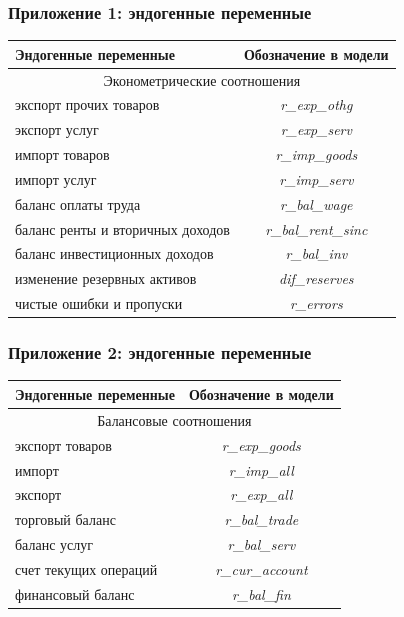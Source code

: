 \documentclass[9pt]{beamer}
\begin{document}
\begin{frame}
\frametitle{Приложение 1: эндогенные переменные}
\small
\begin{center}
	\begin{tabular}{ l | c }
		\toprule
		Эндогенные переменные  & Обозначение в модели  \\
		\midrule
		\multicolumn{2}{c}{Эконометрические соотношения}\\
		\midrule 
		экспорт прочих товаров & \textit{ r\_exp\_othg } \\
		экспорт услуг & \textit{ r\_exp\_serv } \\
		импорт товаров &  \textit{ r\_imp\_goods } \\  
		импорт услуг &  \textit{ r\_imp\_serv } \\  
		баланс оплаты труда &  \textit{ r\_bal\_wage } \\  
		баланс ренты и вторичных доходов &  \textit{ r\_bal\_rent\_sinc } \\ 
		баланс инвестиционных доходов &  \textit{ r\_bal\_inv } \\
		изменение резервных активов &  \textit{ dif\_reserves } \\
		чистые ошибки и пропуски &  \textit{ r\_errors } \\
		\bottomrule
		\end{tabular}

	\label{tab:2}
\end{center}

\end{frame}

\begin{frame}
	\frametitle{Приложение 2: эндогенные переменные}
	\small
	\begin{center}
		\begin{tabular}{ l | c }
			\toprule
			Эндогенные переменные  & Обозначение в модели  \\
			\midrule
		\multicolumn{2}{c}{Балансовые соотношения}\\
		\midrule
		экспорт товаров & \textit{ r\_exp\_goods } \\
		импорт  &  \textit{ r\_imp\_all } \\  
		экспорт  &  \textit{ r\_exp\_all } \\  
		торговый баланс  &  \textit{ r\_bal\_trade } \\
		баланс услуг  &  \textit{ r\_bal\_serv } \\
		счет текущих операций  &  \textit{ r\_cur\_account } \\
		финансовый баланс  &  \textit{ r\_bal\_fin } \\
		\bottomrule
	\end{tabular}
	
	\label{tab:3}
\end{center}
\end{frame}
\end{document}
